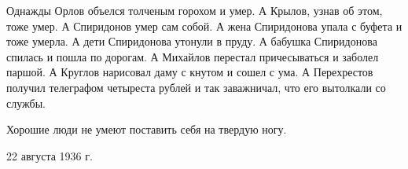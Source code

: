 Однажды Орлов объелся толченым горохом и умер. А Крылов, узнав об этом, тоже умер. А Спиридонов умер сам собой. А жена Спиридонова упала с буфета и тоже умерла. А дети Спиридонова утонули в пруду. А бабушка Спиридонова спилась и пошла по дорогам. А Михайлов перестал причесываться и заболел паршой. А Круглов нарисовал даму с кнутом и сошел с ума. А Перехрестов получил телеграфом четыреста рублей и так заважничал, что его вытолкали со службы.

Хорошие люди не умеют поставить себя на твердую ногу.

22 августа 1936 г.